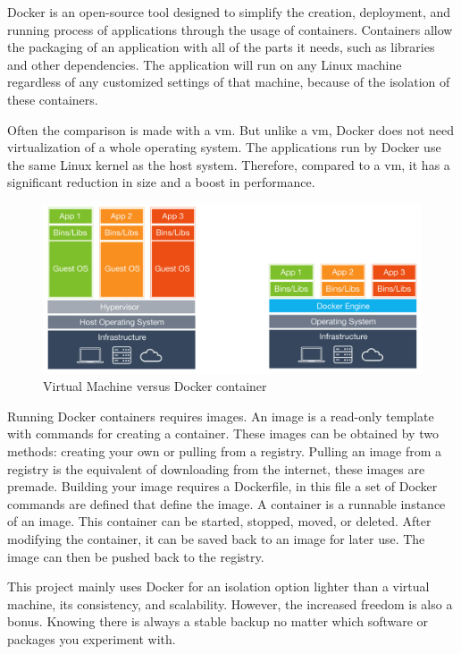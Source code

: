 Docker is an open\hyp{}source tool designed to simplify the creation, deployment, and running process of applications through the usage of containers. Containers allow the packaging of an application with all of the parts it needs, such as libraries and other dependencies. The application will run on any Linux machine regardless of any customized settings of that machine, because of the isolation of these containers. \cite{opensource_what_is_docker}

Often the comparison is made with a \ac{vm}. But unlike a \acs{vm}, Docker does not need virtualization of a whole operating system. The applications run by Docker use the same Linux kernel as the host system. Therefore, compared to a \acs{vm}, it has a significant reduction in size and a boost in performance. \cite{opensource_what_is_docker}

\begin{figure}[!h]
    \centering
    \includegraphics[width=0.8\linewidth]{images/vm_vs_container.png}
    \caption{Virtual Machine versus Docker container}
    \label{fig:vm_vs_container}
\end{figure}

Running Docker containers requires images. An image is a read\hyp{}only template with commands for creating a container. These images can be obtained by two methods: creating your own or pulling from a registry. Pulling an image from a registry is the equivalent of downloading from the internet, these images are premade. Building your image requires a Dockerfile, in this file a set of Docker commands are defined that define the image. A container is a runnable instance of an image. This container can be started, stopped, moved, or deleted. After modifying the container, it can be saved back to an image for later use. The image can then be pushed back to the registry. \cite{docker_get_started_overview}

This project mainly uses Docker for an isolation option lighter than a virtual machine, its consistency, and scalability. However, the increased freedom is also a bonus. Knowing there is always a stable backup no matter which software or packages you experiment with.